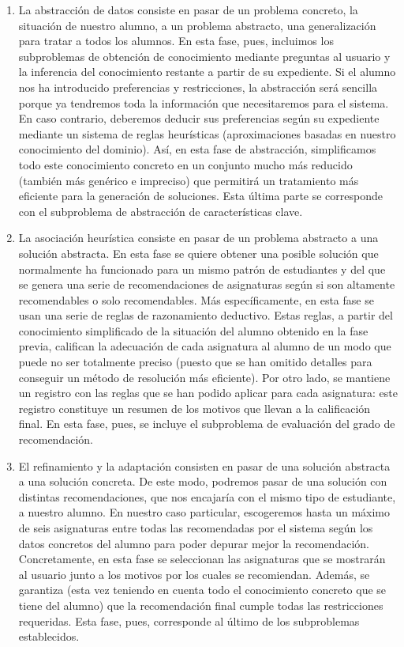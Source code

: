\begin{enumerate}

\item La abstracción de datos consiste en pasar de un problema concreto, 
la situación de nuestro alumno, a un problema abstracto, una generalización 
para tratar a todos los alumnos. En esta fase, pues, incluimos los 
subproblemas de obtención de conocimiento mediante preguntas al usuario y la 
inferencia del conocimiento restante a partir de su expediente. 
Si el alumno nos ha introducido preferencias y restricciones, la abstracción 
será sencilla porque ya tendremos toda la información que necesitaremos para 
el sistema. En caso contrario, deberemos deducir sus preferencias según su 
expediente mediante un sistema de reglas heurísticas (aproximaciones basadas  
en nuestro conocimiento del dominio). Así, en esta fase de abstracción, 
simplificamos todo este conocimiento concreto en un conjunto mucho más 
reducido (también más genérico e impreciso) que permitirá un tratamiento 
más eficiente para la generación de soluciones. Esta última parte se 
corresponde con el subproblema de abstracción de características clave.

\item La asociación heurística consiste en pasar de un problema abstracto a 
una solución abstracta. En esta fase se quiere obtener una posible solución 
que normalmente ha funcionado para un mismo patrón de estudiantes y del que 
se genera una serie de recomendaciones de asignaturas según si son 
altamente recomendables o solo recomendables. Más específicamente, en esta 
fase se usan una serie de reglas de razonamiento deductivo. Estas reglas, a 
partir del conocimiento simplificado de la situación del alumno obtenido en 
la fase previa, califican la adecuación de cada asignatura al alumno de un 
modo que puede no ser totalmente preciso (puesto que se han omitido detalles 
para conseguir un método de resolución más eficiente). Por otro lado, se 
mantiene un registro con las reglas que se han podido aplicar para cada 
asignatura: este registro constituye un resumen de los motivos que llevan a 
la calificación final. En esta fase, pues, se incluye el subproblema de 
evaluación del grado de recomendación.

\item El refinamiento y la adaptación consisten en pasar de una solución 
abstracta a una solución concreta. De este modo, podremos pasar de una 
solución con distintas recomendaciones, que nos encajaría con el mismo 
tipo de estudiante, a nuestro alumno. En nuestro caso particular, escogeremos 
hasta un máximo de seis asignaturas entre todas las recomendadas por el 
sistema según los datos concretos del alumno para poder depurar mejor la 
recomendación. Concretamente, en esta fase se seleccionan las asignaturas que 
se mostrarán al usuario junto a los motivos por los cuales se recomiendan. 
Además, se garantiza (esta vez teniendo en cuenta todo el conocimiento 
concreto que se tiene del alumno) que la recomendación final cumple todas las 
restricciones requeridas. Esta fase, pues, corresponde al último de los 
subproblemas establecidos.

\end{enumerate}

